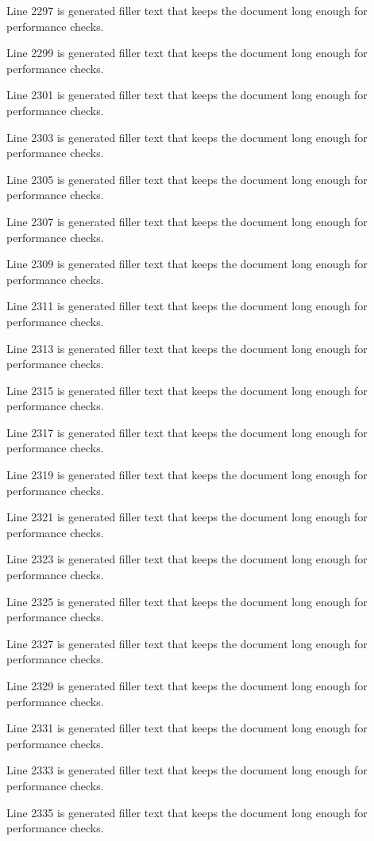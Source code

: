 Line 2297 is generated filler text that keeps the document long enough for performance checks.

Line 2299 is generated filler text that keeps the document long enough for performance checks.

Line 2301 is generated filler text that keeps the document long enough for performance checks.

Line 2303 is generated filler text that keeps the document long enough for performance checks.

Line 2305 is generated filler text that keeps the document long enough for performance checks.

Line 2307 is generated filler text that keeps the document long enough for performance checks.

Line 2309 is generated filler text that keeps the document long enough for performance checks.

Line 2311 is generated filler text that keeps the document long enough for performance checks.

Line 2313 is generated filler text that keeps the document long enough for performance checks.

Line 2315 is generated filler text that keeps the document long enough for performance checks.

Line 2317 is generated filler text that keeps the document long enough for performance checks.

Line 2319 is generated filler text that keeps the document long enough for performance checks.

Line 2321 is generated filler text that keeps the document long enough for performance checks.

Line 2323 is generated filler text that keeps the document long enough for performance checks.

Line 2325 is generated filler text that keeps the document long enough for performance checks.

Line 2327 is generated filler text that keeps the document long enough for performance checks.

Line 2329 is generated filler text that keeps the document long enough for performance checks.

Line 2331 is generated filler text that keeps the document long enough for performance checks.

Line 2333 is generated filler text that keeps the document long enough for performance checks.

Line 2335 is generated filler text that keeps the document long enough for performance checks.

